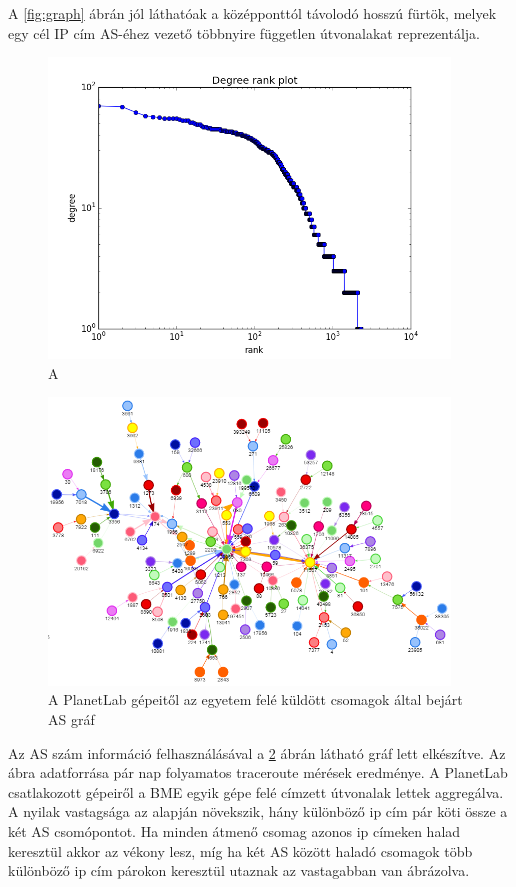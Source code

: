 A \ref{fig:graph} ábrán jól láthatóak a középponttól távolodó hosszú fürtök, melyek egy cél IP cím AS-éhez vezető többnyire független útvonalakat reprezentálja.

\begin{figure}[h]
	\centering
	\includegraphics[width=0.95\textwidth, keepaspectratio]{figures/degree.png}
	\caption{A}
	\label{fig:ip-degree}
\end{figure}

\begin{figure}[h]
	\centering
	\includegraphics[width=0.95\textwidth, keepaspectratio]{figures/as-graph.png}
	\caption{A PlanetLab gépeitől az egyetem felé küldött csomagok által bejárt AS gráf}
	\label{fig:as-graph}
\end{figure}

Az AS szám információ felhasználásával a \ref{fig:as-graph} ábrán látható gráf lett elkészítve. Az ábra adatforrása pár nap folyamatos traceroute mérések eredménye. A PlanetLab csatlakozott gépeiről a BME egyik gépe felé címzett útvonalak lettek aggregálva. A nyilak vastagsága az alapján növekszik, hány különböző ip cím pár köti össze a két AS csomópontot. Ha minden átmenő csomag azonos ip címeken halad keresztül akkor az vékony lesz, míg ha két AS között haladó csomagok több különböző ip cím párokon keresztül utaznak az vastagabban van ábrázolva.

